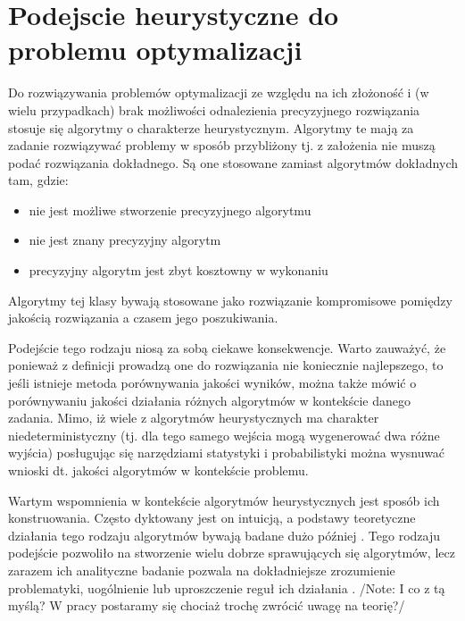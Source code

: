 \documentclass[12pt,a4paper]{report}
\begin{document}
{\section{Podejscie heurystyczne do problemu optymalizacji}
\label{OptHeur}
\par{
Do rozwiązywania problemów optymalizacji ze względu na ich złożoność i (w wielu przypadkach) brak możliwości odnalezienia precyzyjnego rozwiązania stosuje się algorytmy o charakterze heurystycznym. Algorytmy te mają za zadanie rozwiązywać problemy w sposób przybliżony tj. z założenia nie muszą podać rozwiązania dokładnego. Są one stosowane zamiast algorytmów dokładnych tam, gdzie: 
\begin{itemize}
\item nie jest możliwe stworzenie precyzyjnego algorytmu
\item nie jest znany precyzyjny algorytm
\item precyzyjny algorytm jest zbyt kosztowny w wykonaniu
\end{itemize}
}
\par{
Algorytmy tej klasy bywają stosowane jako rozwiązanie kompromisowe pomiędzy jakością rozwiązania a czasem jego poszukiwania.
}
\par{
Podejście tego rodzaju niosą za sobą ciekawe konsekwencje. Warto zauważyć, że ponieważ z definicji prowadzą one do rozwiązania nie koniecznie najlepszego, to jeśli istnieje metoda porównywania jakości wyników, można także mówić o porównywaniu jakości działania różnych algorytmów w kontekście danego zadania. Mimo, iż wiele z algorytmów heurystycznych ma charakter niedeterministyczny (tj. dla tego samego wejścia mogą wygenerować dwa różne wyjścia) posługując się narzędziami statystyki i probabilistyki można wysnuwać wnioski dt. jakości algorytmów w kontekście problemu.
}
\par{
Wartym wspomnienia w kontekście algorytmów heurystycznych jest sposób ich konstruowania. Często dyktowany jest on intuicją, a podstawy teoretyczne działania tego rodzaju algorytmów bywają badane dużo później \cite{Opara}. Tego rodzaju podejście pozwoliło na stworzenie wielu dobrze sprawujących się algorytmów, lecz zarazem ich analityczne badanie pozwala na dokładniejsze zrozumienie problematyki, uogólnienie lub uproszczenie reguł ich działania \cite{Opara}. /Note: I co z tą myślą? W pracy postaramy się chociaż trochę zwrócić uwagę na teorię?/
}
\newpage
}
\end{document}
